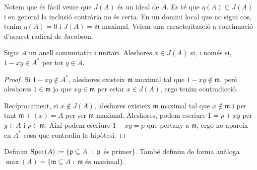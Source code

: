 \documentclass[../../../main.tex]{subfiles}
\begin{document}
Notem que és fàcil veure que $J(A)$ és un ideal de $A$. Es té que $\eta(A)\subseteq J(A)$ i en general la inclusió contrària no és certa. En un domini local que no sigui cos, tenim $\eta(A) = 0$ i $J(A) = \mathfrak{m}$ maximal. Veiem una caracterització a continuació d'aquest radical de Jacobson.

\begin{prop}
\label{prop:radicaljacobson} Sigui $A$ un anell commutatiu i unitari. Aleshores $x\in J(A)$ si, i només si, $1-xy\in A^*$ per tot $y\in A$.
\end{prop}
\begin{proof}
Si $1-xy\not\in A^*$, aleshores existeix $\mathfrak{m}$ maximal tal que $1-xy\not\in\mathfrak{m}$, però aleshores $1\in\mathfrak{m}$ ja que $xy\in\mathfrak{m}$ per estar $x\in J(A)$, ergo tenim contradicció.

Recíprocament, si $x\not\in J(A)$, aleshores existeix $\mathfrak{m}$ maximal tal que $x\not\in\mathfrak{m}$ i per tant $\mathfrak{m}+(x) = A$ per ser $\mathfrak{m}$ maximal. Aleshores, podem escriure $1 = p+xy$ per $y\in A$ i $p\in\mathfrak{m}$. Així podem escriure $1-xy = p$ que pertany a $\mathfrak{m}$, ergo no apareix en $A^*$ cosa que contradiu la hipòtesi.
\end{proof}


\begin{defi}
\label{def:espectre} Definim $\mathrm{Spec}(A):=\{\mathfrak{p}\subseteq A\;:\;\mathfrak{p}$ és primer$\}$. També definim de forma anàloga $\max(A) = \{\mathfrak{m}\subseteq A\;:\;\mathfrak{m}$ és maximal$\}$.
\end{defi}
\end{document}
